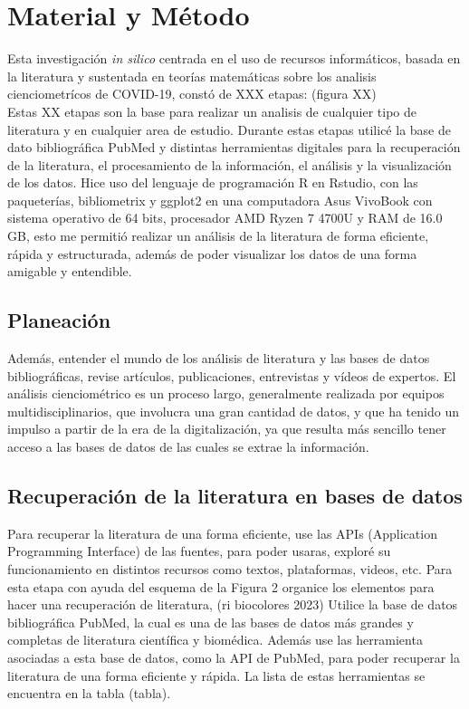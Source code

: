 \chapter{Material y Método}
Esta investigación \textit{in silico} centrada en el uso de recursos informáticos, 
basada en la literatura y sustentada en teorías matemáticas sobre los analisis cienciometrícos de COVID-19, 
constó de XXX etapas:  (figura XX) \\
\smallskip
Estas XX etapas son la base para realizar un analisis de cualquier tipo de literatura y en cualquier area de estudio. 
Durante estas etapas utilicé la base de dato bibliográfica PubMed y 
distintas herramientas digitales para la recuperación de la literatura, el procesamiento de la información, 
el análisis y la visualización de los datos.  
Hice uso del lenguaje de programación R en Rstudio, con las paqueterías, bibliometrix y ggplot2 
en una computadora Asus VivoBook con sistema operativo de 64 bits, procesador AMD Ryzen 7 4700U y RAM de 16.0 GB, 
esto me permitió realizar un análisis de la literatura de forma eficiente, rápida y estructurada,
además de poder visualizar los datos de una forma amigable y entendible.

\section{Planeación}
\noindent
Además, entender el mundo de los análisis de literatura y las bases de datos bibliográficas, 
revise artículos, publicaciones, entrevistas y vídeos de expertos. El análisis cienciométrico 
es un proceso largo, generalmente realizada por equipos multidisciplinarios, que involucra una 
gran cantidad de datos, y que ha tenido un impulso a partir de la era de la digitalización, 
ya que resulta más sencillo tener acceso a las bases de datos de las cuales se extrae la información.

\section{Recuperación de la literatura en bases de datos}
\noindent
Para recuperar la literatura de una forma eficiente, 
use las APIs (Application Programming Interface) de las fuentes, 
para poder usaras, exploré su funcionamiento en distintos recursos como textos, 
plataformas, videos, etc.
Para esta etapa con ayuda del esquema de la Figura 2 organice los elementos para hacer una recuperación de literatura,  (ri biocolores 2023)
Utilice la base de datos bibliográfica PubMed, la cual es una de las bases de datos más grandes y 
completas de literatura científica y biomédica. Además use las herramienta asociadas a esta base de datos,
como la API de PubMed, para poder recuperar la literatura de una forma eficiente y rápida. La lista de estas 
herramientas se encuentra en la tabla (tabla).

